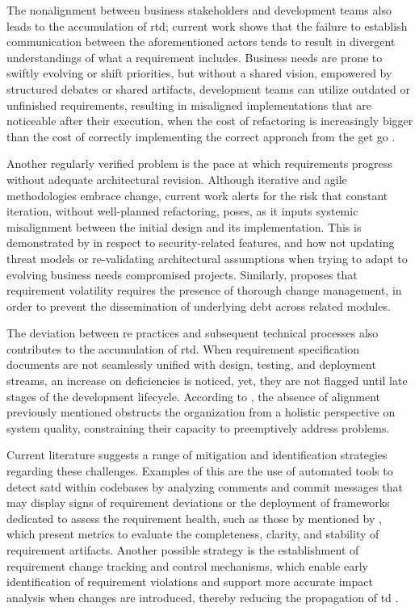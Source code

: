 \documentclass[12pt,reqno, twoside]{amsbook}
\theoremstyle{plain}
\numberwithin{equation}{chapter}
\numberwithin{section}{chapter}
\begin{document}
The nonalignment between business stakeholders and development teams also leads to the accumulation of \gls{rtd}; current work shows that the failure to establish communication between the aforementioned actors tends to result in divergent understandings of what a requirement includes. Business needs are prone to swiftly evolving or shift priorities, but without a shared vision, empowered by structured debates or shared artifacts,  development teams can utilize outdated or unfinished requirements, resulting in misaligned implementations that are noticeable after their execution, when the cost of refactoring is increasingly bigger than the cost of correctly implementing the correct approach from the get go \parencite{Seyff2018, Gralha2018}.

Another regularly verified problem is the pace at which requirements progress without adequate architectural revision. Although iterative and agile methodologies embrace change, current work alerts for the risk that constant iteration, without well-planned refactoring, poses, as it inputs systemic misalignment between the initial design and its implementation. This is demonstrated by \textcite{Herath2025} in respect to security-related features, and how not updating threat models or re-validating architectural assumptions when trying to adapt to evolving business needs compromised projects. Similarly, \textcite{Villamizar2018} proposes that  requirement volatility requires the presence of thorough change management, in order to prevent the dissemination of underlying debt across related modules.

The deviation between \gls{re} practices and subsequent technical processes also contributes to the accumulation of \gls{rtd}. When requirement specification documents are not seamlessly unified with design, testing, and deployment streams, an increase on deficiencies is noticed, yet, they are not flagged until late stages of the development lifecycle. According  to \textcite{Venters2023}, the absence of alignment previously mentioned obstructs the organization from a holistic perspective on system quality, constraining their capacity to preemptively address problems.

Current literature suggests a range of mitigation and identification strategies regarding these challenges. Examples of this are the use of automated tools to detect \gls{satd} within codebases by analyzing comments and commit messages that may display signs of requirement deviations \parencite{Li2020} or the  deployment of frameworks dedicated to assess the requirement health, such as those by mentioned by \textcite{Lenarduzzi2019}, which present metrics to evaluate the completeness, clarity, and stability of requirement artifacts. Another possible strategy is the establishment of requirement change tracking and control mechanisms, which enable early identification of requirement violations and support more accurate impact analysis when changes are introduced, thereby reducing the propagation of \gls{td} \parencite{Freire2020}.
\end{document}
